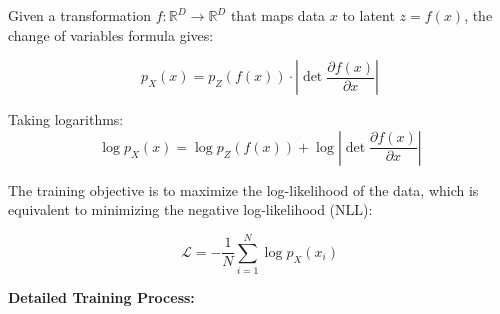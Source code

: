 \documentclass[conference,12pt]{IEEEtran}
\begin{document}
Given a transformation $f: \mathbb{R}^D \rightarrow \mathbb{R}^D$ that maps data $x$ to latent $z = f(x)$, the change of variables formula gives:

\begin{equation}
    p_X(x) = p_Z(f(x)) \cdot \left|\det \frac{\partial f(x)}{\partial x}\right|
\end{equation}

Taking logarithms:
\begin{equation}
    \log p_X(x) = \log p_Z(f(x)) + \log \left|\det \frac{\partial f(x)}{\partial x}\right|
\end{equation}

The training objective is to maximize the log-likelihood of the data, which is equivalent to minimizing the negative log-likelihood (NLL):

\begin{equation}
    \mathcal{L} = -\frac{1}{N}\sum_{i=1}^{N} \log p_X(x_i)
\end{equation}

\textbf{Detailed Training Process:}
\end{document}
